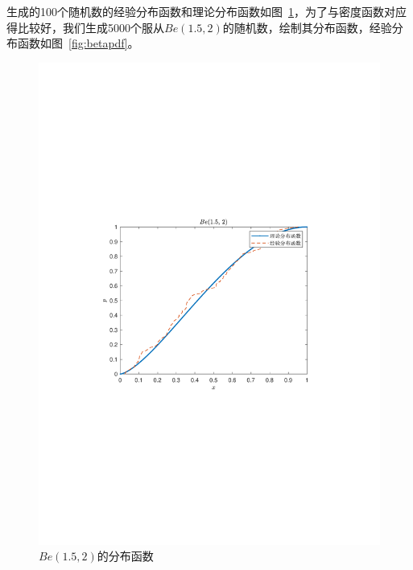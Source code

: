 生成的100个随机数的经验分布函数和理论分布函数如图~\ref{fig:betacdf}，为了与密度函数对应得比较好，我们生成5000个服从$Be(1.5,2)$的随机数，绘制其分布函数，经验分布函数如图~\ref{fig:betapdf}。

\begin{figure}[htbp]
    \begin{minipage}[t]{0.5\textwidth}
        \centering
        \includegraphics[width = \textwidth]{image/betacdf.pdf}
        \caption{$Be(1.5, 2)$的分布函数}
        \label{fig:betacdf}
    \end{minipage}
    \hfill
    \begin{minipage}[t]{0.5\textwidth}
        \centering

\end{minipage}
\end{figure}
